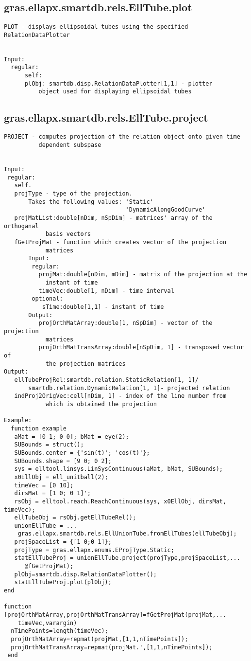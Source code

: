 \subsection{\texorpdfstring{gras.ellapx.smartdb.rels.EllTube.plot}{plot}}\label{method:gras.ellapx.smartdb.rels.EllTube.plot}
\begin{verbatim}
PLOT - displays ellipsoidal tubes using the specified RelationDataPlotter


Input:
  regular:
      self:
      plObj: smartdb.disp.RelationDataPlotter[1,1] - plotter
          object used for displaying ellipsoidal tubes
\end{verbatim}
\subsection{\texorpdfstring{gras.ellapx.smartdb.rels.EllTube.project}{project}}\label{method:gras.ellapx.smartdb.rels.EllTube.project}
\begin{verbatim}
PROJECT - computes projection of the relation object onto given time
          dependent subspase


Input:
 regular:
   self.
   projType - type of the projection.
       Takes the following values: 'Static'
                                   'DynamicAlongGoodCurve'
   projMatList:double[nDim, nSpDim] - matrices' array of the orthoganal
            basis vectors
   fGetProjMat - function which creates vector of the projection
            matrices
       Input:
        regular:
          projMat:double[nDim, mDim] - matrix of the projection at the
            instant of time
          timeVec:double[1, nDim] - time interval
        optional:
           sTime:double[1,1] - instant of time
       Output:
          projOrthMatArray:double[1, nSpDim] - vector of the projection
            matrices
          projOrthMatTransArray:double[nSpDim, 1] - transposed vector of
            the projection matrices
Output:
   ellTubeProjRel:smartdb.relation.StaticRelation[1, 1]/
       smartdb.relation.DynamicRelation[1, 1]- projected relation
   indProj2OrigVec:cell[nDim, 1] - index of the line number from
            which is obtained the projection

Example:
  function example
   aMat = [0 1; 0 0]; bMat = eye(2);
   SUBounds = struct();
   SUBounds.center = {'sin(t)'; 'cos(t)'};
   SUBounds.shape = [9 0; 0 2];
   sys = elltool.linsys.LinSysContinuous(aMat, bMat, SUBounds);
   x0EllObj = ell_unitball(2);
   timeVec = [0 10];
   dirsMat = [1 0; 0 1]';
   rsObj = elltool.reach.ReachContinuous(sys, x0EllObj, dirsMat, timeVec);
   ellTubeObj = rsObj.getEllTubeRel();
   unionEllTube = ...
    gras.ellapx.smartdb.rels.EllUnionTube.fromEllTubes(ellTubeObj);
   projSpaceList = {[1 0;0 1]};
   projType = gras.ellapx.enums.EProjType.Static;
   statEllTubeProj = unionEllTube.project(projType,projSpaceList,...
      @fGetProjMat);
   plObj=smartdb.disp.RelationDataPlotter();
   statEllTubeProj.plot(plObj);
end

function [projOrthMatArray,projOrthMatTransArray]=fGetProjMat(projMat,...
    timeVec,varargin)
  nTimePoints=length(timeVec);
  projOrthMatArray=repmat(projMat,[1,1,nTimePoints]);
  projOrthMatTransArray=repmat(projMat.',[1,1,nTimePoints]);
 end
\end{verbatim}
